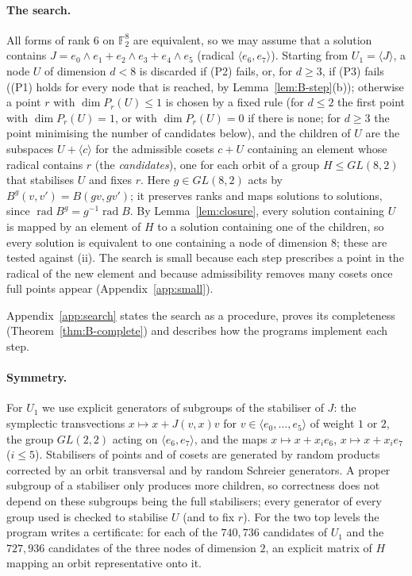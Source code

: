 \documentclass[11pt]{article}
\theoremstyle{definition}
\newcommand{\F}{\mathbb{F}}
\DeclareMathOperator{\rad}{rad}
\begin{document}
\paragraph{The search.} All forms of rank $6$ on $\F_2^8$ are equivalent, so we may assume that
a solution contains $J=e_0\wedge e_1+e_2\wedge e_3+e_4\wedge e_5$ (radical
$\langle e_6,e_7\rangle$). Starting from $U_1=\langle J\rangle$, a node $U$ of dimension $d<8$ is
discarded if (P2) fails, or, for $d\ge3$, if (P3) fails ((P1) holds for every node that is
reached, by Lemma~\ref{lem:B-step}(b)); otherwise a point $r$ with
$\dim P_r(U)\le1$ is chosen by a fixed rule (for $d\le2$ the first point with $\dim P_r(U)=1$,
or with $\dim P_r(U)=0$ if there is none; for $d\ge3$ the point minimising the number of
candidates below), and the children of $U$ are the subspaces $U+\langle c\rangle$ for the
admissible cosets $c+U$ containing an element whose radical contains $r$ (the
\emph{candidates}), one for each orbit of a group $H\le GL(8,2)$ that stabilises $U$ and fixes
$r$. Here $g\in GL(8,2)$ acts by $B^g(v,v')=B(gv,gv')$; it preserves ranks and maps solutions to
solutions, since $\rad B^g=g^{-1}\rad B$. By Lemma~\ref{lem:closure}, every solution containing
$U$ is mapped by an element of $H$ to a solution containing one of the children, so every
solution is equivalent to one containing a node of dimension $8$; these are tested against (ii).
The search is small because each step prescribes a point in the radical of the new element
and because admissibility removes many cosets once full points appear
(Appendix~\ref{app:small}).

Appendix~\ref{app:search} states the search as a procedure, proves its completeness
(Theorem~\ref{thm:B-complete}) and describes how the programs implement each step.

\paragraph{Symmetry.} For $U_1$ we use explicit generators of subgroups of the stabiliser of $J$:
the symplectic transvections $x\mapsto x+J(v,x)v$ for $v\in\langle e_0,\dots,e_5\rangle$ of
weight $1$ or $2$, the group $GL(2,2)$ acting on $\langle e_6,e_7\rangle$, and the maps
$x\mapsto x+x_ie_6$, $x\mapsto x+x_ie_7$ ($i\le5$). Stabilisers of points and of cosets are
generated by random products corrected by an orbit transversal and by random Schreier
generators. A proper subgroup of a stabiliser only produces more children, so correctness does
not depend on these subgroups being the full stabilisers; every generator of every group used is
checked to stabilise $U$ (and to fix $r$). For the two top levels the program writes a
certificate: for each of the $740{,}736$ candidates of $U_1$ and the $727{,}936$ candidates of
the three nodes of dimension $2$, an explicit matrix of $H$ mapping an orbit representative onto
it.
\end{document}
